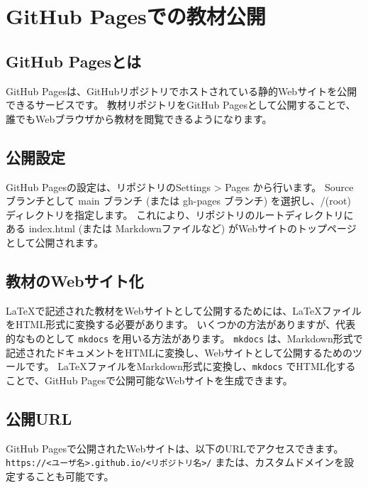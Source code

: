 \section{GitHub Pagesでの教材公開}

\subsection{GitHub Pagesとは}
GitHub Pagesは、GitHubリポジトリでホストされている静的Webサイトを公開できるサービスです。
教材リポジトリをGitHub Pagesとして公開することで、誰でもWebブラウザから教材を閲覧できるようになります。

\subsection{公開設定}
GitHub Pagesの設定は、リポジトリのSettings > Pages から行います。
Source ブランチとして main ブランチ (または gh-pages ブランチ) を選択し、/(root) ディレクトリを指定します。
これにより、リポジトリのルートディレクトリにある index.html (または Markdownファイルなど) がWebサイトのトップページとして公開されます。

\subsection{教材のWebサイト化}
\LaTeX{}で記述された教材をWebサイトとして公開するためには、\LaTeX{}ファイルをHTML形式に変換する必要があります。
いくつかの方法がありますが、代表的なものとして \texttt{mkdocs} を用いる方法があります。
\texttt{mkdocs} は、Markdown形式で記述されたドキュメントをHTMLに変換し、Webサイトとして公開するためのツールです。
\LaTeX{}ファイルをMarkdown形式に変換し、\texttt{mkdocs} でHTML化することで、GitHub Pagesで公開可能なWebサイトを生成できます。

\subsection{公開URL}
GitHub Pagesで公開されたWebサイトは、以下のURLでアクセスできます。
\texttt{https://<ユーザ名>.github.io/<リポジトリ名>/}
または、カスタムドメインを設定することも可能です。
